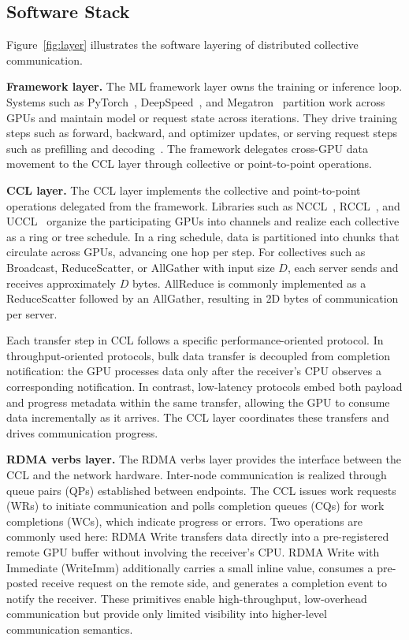 \documentclass[letterpaper,twocolumn,10pt]{article}
\begin{document}
\subsection{Software Stack}
\label{sec:bg-failures}
Figure~\ref{fig:layer} illustrates the software layering of distributed collective communication.

\smallskip\noindent\textbf{Framework layer.}
The ML framework layer owns the training or inference loop. Systems such as PyTorch~\cite{paszke2019pytorch}, DeepSpeed~\cite{rasley2020deepspeed}, and Megatron~\cite{shoeybi2019megatron} partition work across GPUs and maintain model or request state across iterations. They drive training steps such as forward, backward, and optimizer updates, or serving request steps such as prefilling and decoding~\cite{kwon2023efficient,agrawal2024taming,zhong2024distserve}. The framework delegates cross-GPU data movement to the CCL layer through collective or point-to-point operations.

\smallskip\noindent\textbf{CCL layer.}
The CCL layer implements the collective and point-to-point operations delegated from the framework. Libraries such as NCCL~\cite{NCCL}, RCCL~\cite{RCCL}, and UCCL~\cite{zhou2025extensible} organize the participating GPUs into channels and realize each collective as a ring or tree schedule. In a ring schedule, data is partitioned into chunks that circulate across GPUs, advancing one hop per step. For collectives such as Broadcast, ReduceScatter, or AllGather with input size $D$, each server sends and receives approximately $D$ bytes. AllReduce is commonly implemented as a ReduceScatter followed by an AllGather, resulting in 2D bytes of communication per server.

Each transfer step in CCL follows a specific performance-oriented protocol. In throughput-oriented protocols, bulk data transfer is decoupled from completion notification: the GPU processes data only after the receiver’s CPU observes a corresponding notification. In contrast, low-latency protocols embed both payload and progress metadata within the same transfer, allowing the GPU to consume data incrementally as it arrives. The CCL layer coordinates these transfers and drives communication progress.

\smallskip\noindent\textbf{RDMA verbs layer.}
The RDMA verbs layer provides the interface between the CCL and the network hardware. Inter-node communication is realized through queue pairs (QPs) established between endpoints. The CCL issues work requests (WRs) to initiate communication and polls completion queues (CQs) for work completions (WCs), which indicate progress or errors. Two operations are commonly used here: RDMA Write transfers data directly into a pre-registered remote GPU buffer without involving the receiver's CPU. RDMA Write with Immediate (WriteImm) additionally carries a small inline value, consumes a pre-posted receive request on the remote side, and generates a completion event to notify the receiver. These primitives enable high-throughput, low-overhead communication but provide only limited visibility into higher-level communication semantics.
\end{document}
